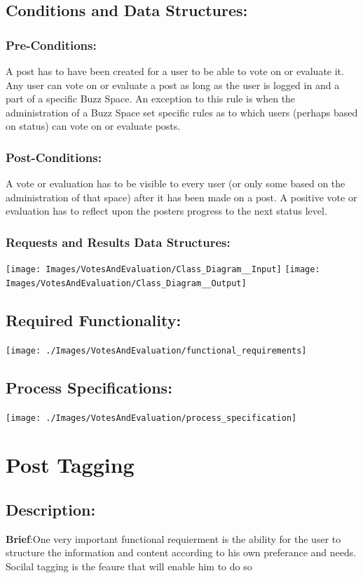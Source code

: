 \documentclass[a4paper,11pt]{article}
\begin{document}
\subsection{Conditions and Data Structures:}
\subsubsection*{Pre-Conditions:}
A post has to have been created for a user to be able to vote on or evaluate it. Any user can vote on or evaluate a post as long as the user is logged in and a part of a specific Buzz Space. An exception to this rule is when the administration of a Buzz Space set specific rules as to which users (perhaps based on status) can vote on or evaluate posts.
\subsubsection*{Post-Conditions:}
A vote or evaluation has to be visible to every user (or only some based on the administration of that space) after it has been made on a post. A positive vote or evaluation has to reflect upon the posters progress to the next status level.
\subsubsection*{Requests and Results Data Structures:}
\texttt{[image: Images/VotesAndEvaluation/Class\_Diagram\_\_Input]}
\texttt{[image: Images/VotesAndEvaluation/Class\_Diagram\_\_Output]}
\subsection{Required Functionality:} 
\begin{center}
\texttt{[image: ./Images/VotesAndEvaluation/functional\_requirements]}
\end{center}
\subsection{Process Specifications:} 
\begin{center}
\texttt{[image: ./Images/VotesAndEvaluation/process\_specification]}
\end{center}

\section{Post Tagging}
\subsection*{Description:}
\textbf{Brief}:One very important functional requierment is the ability for the user to structure the information and content according to his own preferance and needs. Socilal tagging is the feaure that will enable him to do so
\end{document}
